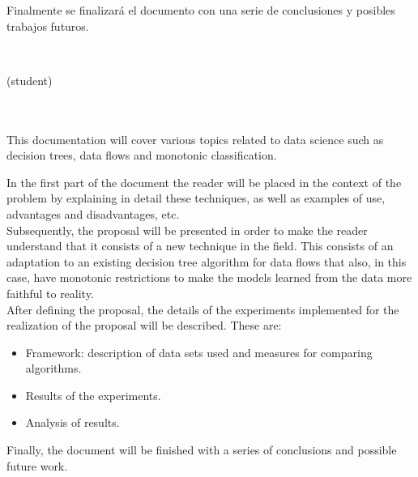 Finalmente se finalizará el documento con una serie de conclusiones y posibles trabajos futuros.

\cleardoublepage


\thispagestyle{empty}


\begin{center}
{\large\bfseries \myTitleEng}\\
\end{center}
\begin{center}
\myName (student)\\
\end{center}

\\

\vspace{0.7cm}
\\

This documentation will cover various topics related to data science such as decision trees, data flows and monotonic classification.

In the first part of the document the reader will be placed in the context of the problem by explaining in detail these techniques, as well as examples of use, advantages and disadvantages, etc. \\

Subsequently, the proposal will be presented in order to make the reader understand that it consists of a new technique in the field. This consists of an adaptation to an existing decision tree algorithm for data flows that also, in this case, have monotonic restrictions to make the models learned from the data more faithful to reality. \\

After defining the proposal, the details of the experiments implemented for the realization of the proposal will be described. These are:
\begin {itemize}
\item Framework: description of data sets used and measures for comparing algorithms.
\item Results of the experiments.
\item Analysis of results.
\end {itemize}

Finally, the document will be finished with a series of conclusions and possible future work.


